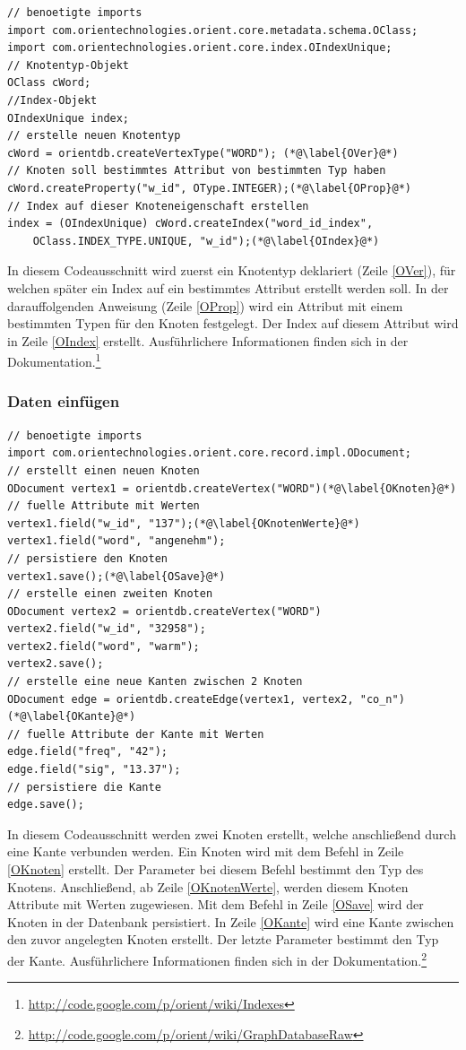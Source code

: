 \documentclass[11pt, a4paper, oneside]{article} %
\begin{document}
\begin{lstlisting}[caption={OrientDB - Indizes erstellen}, label=lstIndiz]
// benoetigte imports
import com.orientechnologies.orient.core.metadata.schema.OClass;
import com.orientechnologies.orient.core.index.OIndexUnique;
// Knotentyp-Objekt
OClass cWord;
//Index-Objekt
OIndexUnique index;
// erstelle neuen Knotentyp
cWord = orientdb.createVertexType("WORD"); (*@\label{OVer}@*)
// Knoten soll bestimmtes Attribut von bestimmten Typ haben
cWord.createProperty("w_id", OType.INTEGER);(*@\label{OProp}@*)
// Index auf dieser Knoteneigenschaft erstellen
index = (OIndexUnique) cWord.createIndex("word_id_index",
	OClass.INDEX_TYPE.UNIQUE, "w_id");(*@\label{OIndex}@*)
\end{lstlisting}

In diesem Codeausschnitt wird zuerst ein Knotentyp deklariert (Zeile \ref{OVer}), für welchen später ein Index auf ein bestimmtes Attribut erstellt werden soll. In der darauffolgenden Anweisung (Zeile \ref{OProp}) wird ein Attribut mit einem bestimmten Typen für den Knoten festgelegt. Der Index auf diesem Attribut wird in Zeile \ref{OIndex} erstellt. 
Ausführlichere Informationen finden sich in der Dokumentation.\footnote{\url{http://code.google.com/p/orient/wiki/Indexes}}
\newpage
\subsubsection{Daten einfügen}

\begin{lstlisting}[caption={OrientDB - Daten einfügen}]
// benoetigte imports
import com.orientechnologies.orient.core.record.impl.ODocument;
// erstellt einen neuen Knoten
ODocument vertex1 = orientdb.createVertex("WORD")(*@\label{OKnoten}@*)
// fuelle Attribute mit Werten
vertex1.field("w_id", "137");(*@\label{OKnotenWerte}@*)
vertex1.field("word", "angenehm");
// persistiere den Knoten
vertex1.save();(*@\label{OSave}@*)
// erstelle einen zweiten Knoten
ODocument vertex2 = orientdb.createVertex("WORD")
vertex2.field("w_id", "32958");
vertex2.field("word", "warm");
vertex2.save();
// erstelle eine neue Kanten zwischen 2 Knoten
ODocument edge = orientdb.createEdge(vertex1, vertex2, "co_n")(*@\label{OKante}@*)
// fuelle Attribute der Kante mit Werten
edge.field("freq", "42");
edge.field("sig", "13.37");
// persistiere die Kante
edge.save();
\end{lstlisting}

In diesem Codeausschnitt werden zwei Knoten erstellt, welche anschließend durch eine Kante verbunden werden. Ein Knoten wird mit dem Befehl in Zeile \ref{OKnoten} erstellt. Der Parameter bei diesem Befehl bestimmt den Typ des Knotens. Anschließend, ab Zeile \ref{OKnotenWerte}, werden diesem Knoten Attribute mit Werten zugewiesen. Mit dem Befehl in Zeile \ref{OSave} wird der Knoten in der Datenbank persistiert. In Zeile \ref{OKante} wird eine Kante zwischen den zuvor angelegten Knoten erstellt. Der letzte Parameter bestimmt den Typ der Kante.
Ausführlichere Informationen finden sich in der Dokumentation.\footnote{\url{http://code.google.com/p/orient/wiki/GraphDatabaseRaw}}
\end{document}
